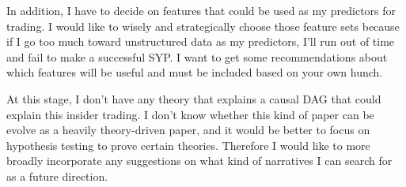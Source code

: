 \documentclass[12pt,letterpaper]{article}
\begin{document}
In addition, I have to decide on features that could be used as my predictors for trading. I would like to wisely and strategically choose those feature sets because if I go too much toward unstructured data as my predictors, I'll run out of time and fail to make a successful SYP. I want to get some recommendations about which features will be useful and must be included based on your own hunch.

At this stage, I don't have any theory that explains a causal DAG that could explain this insider trading. I don't know whether this kind of paper can be evolve as a heavily theory-driven paper, and it would be better to focus on hypothesis testing to prove certain theories. Therefore I would like to more broadly incorporate any suggestions on what kind of narratives I can search for as a future direction.




\end{document}
